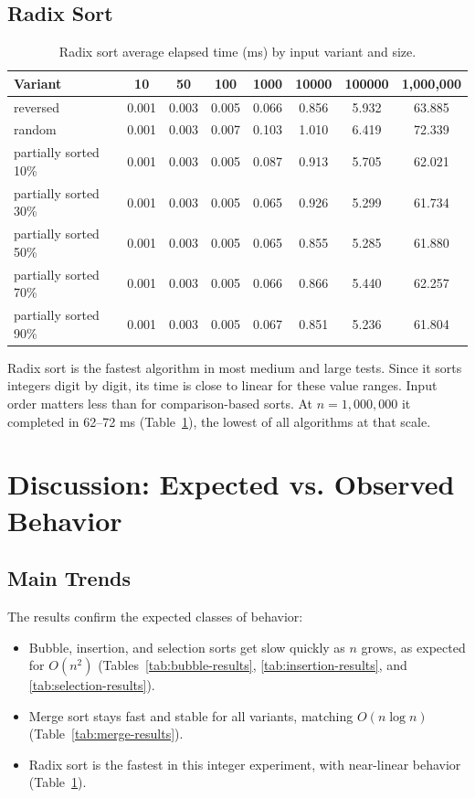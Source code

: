 \documentclass[11pt,a4paper]{article}
\begin{document}
\subsection{Radix Sort}
\begin{table}[H]
\centering
\footnotesize
\begin{tabular}{lccccccc}
\toprule
Variant & 10 & 50 & 100 & 1000 & 10000 & 100000 & 1{,}000{,}000 \\
\midrule
reversed & 0.001 & 0.003 & 0.005 & 0.066 & 0.856 & 5.932 & 63.885 \\
random & 0.001 & 0.003 & 0.007 & 0.103 & 1.010 & 6.419 & 72.339 \\
partially sorted 10\% & 0.001 & 0.003 & 0.005 & 0.087 & 0.913 & 5.705 & 62.021 \\
partially sorted 30\% & 0.001 & 0.003 & 0.005 & 0.065 & 0.926 & 5.299 & 61.734 \\
partially sorted 50\% & 0.001 & 0.003 & 0.005 & 0.065 & 0.855 & 5.285 & 61.880 \\
partially sorted 70\% & 0.001 & 0.003 & 0.005 & 0.066 & 0.866 & 5.440 & 62.257 \\
partially sorted 90\% & 0.001 & 0.003 & 0.005 & 0.067 & 0.851 & 5.236 & 61.804 \\
\bottomrule
\end{tabular}
\caption{Radix sort average elapsed time (ms) by input variant and size.}
\label{tab:radix-results}
\end{table}

Radix sort is the fastest algorithm in most medium and large tests. Since it sorts integers digit by digit, its time is close to linear for these value ranges. Input order matters less than for comparison-based sorts. At \(n=1{,}000{,}000\) it completed in 62--72 ms (Table~\ref{tab:radix-results}), the lowest of all algorithms at that scale.

\section{Discussion: Expected vs. Observed Behavior}
\subsection{Main Trends}
The results confirm the expected classes of behavior:
\begin{itemize}
    \item Bubble, insertion, and selection sorts get slow quickly as \(n\) grows, as expected for \(O(n^2)\) (Tables~\ref{tab:bubble-results}, \ref{tab:insertion-results}, and \ref{tab:selection-results}).
    \item Merge sort stays fast and stable for all variants, matching \(O(n\log n)\) (Table~\ref{tab:merge-results}).
    \item Radix sort is the fastest in this integer experiment, with near-linear behavior (Table~\ref{tab:radix-results}).
\end{itemize}
\end{document}
